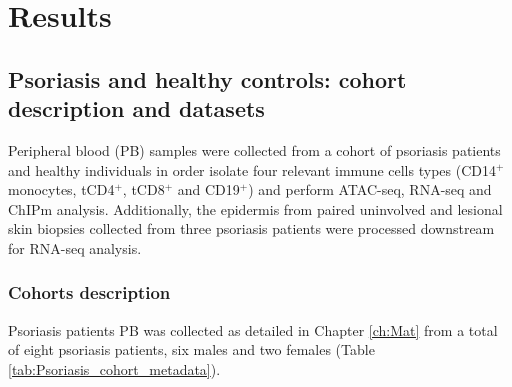 
\section{Results}
\subsection{Psoriasis and healthy controls: cohort description and datasets}
Peripheral blood (PB) samples were collected from a cohort of psoriasis patients and healthy individuals in order isolate four relevant immune cells types (CD14$^+$ monocytes, tCD4$^+$, tCD8$^+$ and CD19$^+$) and perform ATAC-seq, RNA-seq and ChIPm analysis. Additionally, the epidermis from paired uninvolved and lesional skin biopsies collected from three psoriasis patients were processed downstream for RNA-seq analysis.

\subsubsection{Cohorts description}

Psoriasis patients PB was collected as detailed in Chapter \ref{ch:Mat} from a total of eight psoriasis patients, six males and two females (Table \ref{tab:Psoriasis_cohort_metadata}). 


